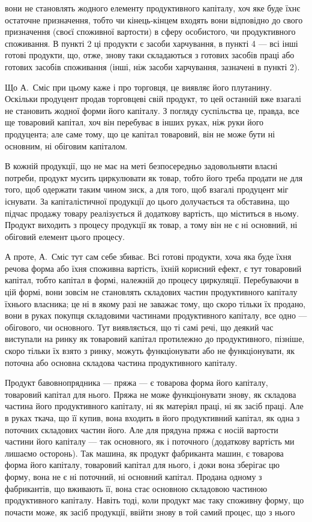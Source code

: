 \parcont{}  %
вони не становлять жодного елементу продуктивного капіталу, хоч яке
буде їхнє остаточне призначення, тобто чи кінець-кінцем входять вони
відповідно до свого призначення (своєї споживної вартости) в сферу особистого,
чи продуктивного споживання. В пункті 2 ці продукти є засоби
харчування, в пункті 4 — всі інші готові продукти, що, отже, знову таки
складаються з готових засобів праці або готових засобів споживання
(інші, ніж засоби харчування, зазначені в пункті 2).

Що А.~Сміс при цьому каже і про торговця, це виявляє його плутанину.
Оскільки продуцент продав торговцеві свій продукт, то цей останній
вже взагалі не становить жодної форми його капіталу. З погляду
суспільства це, правда, все ще товаровий капітал, хоч він перебуває в
інших руках, ніж руки його продуцента; але саме тому, що це капітал
товаровий, він не може бути ні основним, ні обіговим капіталом.

В кожній продукції, що не має на меті безпосередньо задовольняти
власні потреби, продукт мусить циркулювати як товар, тобто його
треба продати не для того, щоб одержати таким чином зиск, а для того,
щоб взагалі продуцент міг існувати. За капіталістичної продукції до
цього долучається та обставина, що підчас продажу товару реалізується
й додаткову вартість, що міститься в ньому. Продукт виходить з процесу
продукції як товар, а тому він не є ні основний, ні обіговий елемент
цього процесу.

А проте, А.~Сміс тут сам себе збиває. Всі готові продукти, хоча
яка буде їхня речова форма або їхня споживна вартість, їхній корисний
ефект, є тут товаровий капітал, тобто капітал в формі, належній до процесу
циркуляції. Перебуваючи в цій формі, вони зовсім не становлять
складових частин продуктивного капіталу їхнього власника; це ні в якому
разі не заважає тому, що скоро тільки їх продано, вони  в
руках покупця складовими частинами продуктивного капіталу, все одно —
обігового, чи основного. Тут виявляється, що ті самі речі, що деякий
час виступали на ринку як товаровий капітал протилежно до продуктивного,
пізніше, скоро тільки їх взято з ринку, можуть функціонувати або
не функціонувати, як поточна або основна складова частина продуктивного
капіталу.

Продукт бавовнопрядника — пряжа — є товарова форма його капіталу,
товаровий капітал для нього. Пряжа не може функціонувати знову, як
складова частина його продуктивного капіталу, ні як матеріял праці, ні
як засіб праці. Але в руках ткача, що її купив, вона входить в його
продуктивний капітал, як одна з поточних складових частин його. Але
для прядуна пряжа є носій вартости частини його капіталу — так основного,
як і поточного (додаткову вартість ми лишаємо осторонь). Так
машина, як продукт фабриканта машин, є товарова форма його капіталу,
товаровий капітал для нього, і доки вона зберігає цю форму, вона не є
ні поточний, ні основний капітал. Продана одному з фабрикантів, що
вживають її, вона стає основною складовою частиною продуктивного капіталу.
Навіть тоді, коли продукт має таку споживну форму, що почасти
може, як засіб продукції, ввійти знову в той самий процес, що з нього
\parbreak{}  %
